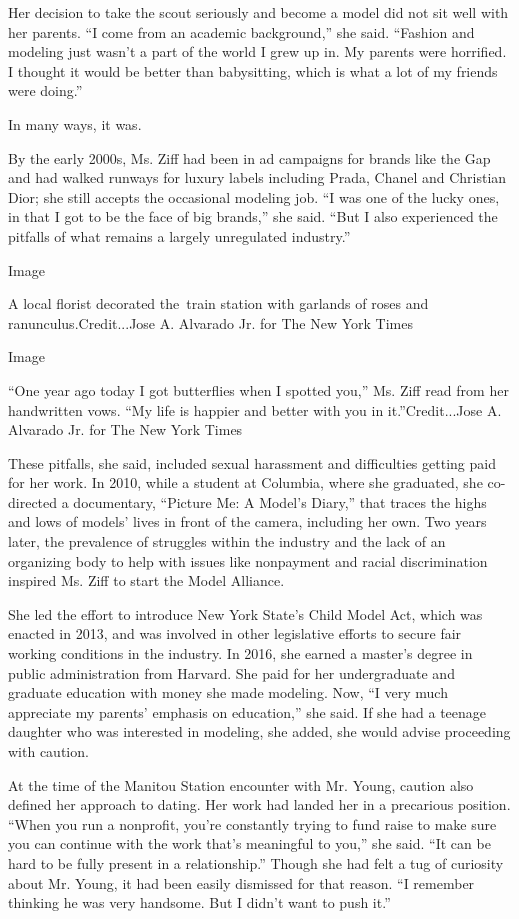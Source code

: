 Her decision to take the scout seriously and become a model did not sit
well with her parents. ``I come from an academic background,'' she said.
``Fashion and modeling just wasn't a part of the world I grew up in. My
parents were horrified. I thought it would be better than babysitting,
which is what a lot of my friends were doing.''

In many ways, it was.

By the early 2000s, Ms. Ziff had been in ad campaigns for brands like
the Gap and had walked runways for luxury labels including Prada, Chanel
and Christian Dior; she still accepts the occasional modeling job. ``I
was one of the lucky ones, in that I got to be the face of big brands,''
she said. ``But I also experienced the pitfalls of what remains a
largely unregulated industry.''

Image

A local florist decorated the~train station with garlands of roses and
ranunculus.Credit...Jose A. Alvarado Jr. for The New York Times

Image

``One year ago today I got butterflies when I spotted you,'' Ms. Ziff
read from her handwritten vows. ``My life is happier and better with you
in it.''Credit...Jose A. Alvarado Jr. for The New York Times

These pitfalls, she said, included sexual harassment and difficulties
getting paid for her work. In 2010, while a student at Columbia, where
she graduated, she co-directed a documentary, ``Picture Me: A Model's
Diary,'' that traces the highs and lows of models' lives in front of the
camera, including her own. Two years later, the prevalence of struggles
within the industry and the lack of an organizing body to help with
issues like nonpayment and racial discrimination inspired Ms. Ziff to
start the Model Alliance.

She led the effort to introduce New York State's Child Model Act, which
was enacted in 2013, and was involved in other legislative efforts to
secure fair working conditions in the industry. In 2016, she earned a
master's degree in public administration from Harvard. She paid for her
undergraduate and graduate education with money she made modeling. Now,
``I very much appreciate my parents' emphasis on education,'' she said.
If she had a teenage daughter who was interested in modeling, she added,
she would advise proceeding with caution.

At the time of the Manitou Station encounter with Mr. Young, caution
also defined her approach to dating. Her work had landed her in a
precarious position. ``When you run a nonprofit, you're constantly
trying to fund raise to make sure you can continue with the work that's
meaningful to you,'' she said. ``It can be hard to be fully present in a
relationship.'' Though she had felt a tug of curiosity about Mr. Young,
it had been easily dismissed for that reason. ``I remember thinking he
was very handsome. But I didn't want to push it.''

